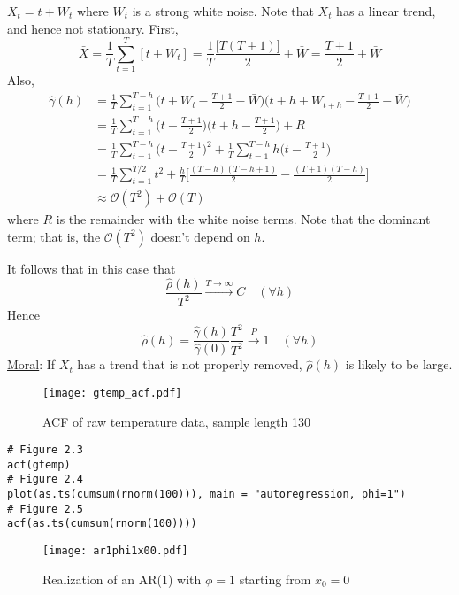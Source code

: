 \begin{Example}{}{}
    $ X_t=t+W_t $ where $ W_t $ is a strong white noise. Note that
    $ X_t $ has a linear trend, and hence not stationary.
    First,
    \[ \bar{X}=\frac{1}{T} \sum_{t=1}^{T}[t+W_t]=\frac{1}{T}
        \frac{\bigl[T(T+1)\bigr]}{2}+\bar{W}=\frac{T+1}{2} +\bar{W}  \]
    Also,
    \begin{align*}
        \hat{\gamma}(h)
         & =\frac{1}{T} \sum_{t=1}^{T-h}\biggl(t+W_t-\frac{T+1}{2} -\bar{W}\biggr)\biggl(t+h+W_{t+h}-\frac{T+1}{2}-\bar{W}\biggr)        \\
         & =\frac{1}{T} \sum_{t=1}^{T-h}\biggl(t-\frac{T+1}{2}\biggr)\biggl(t+h-\frac{T+1}{2}\biggr)+R                                   \\
         & =\frac{1}{T} \sum_{t=1}^{T-h} \biggl(t-\frac{T+1}{2}\biggr)^{\!2}+\frac{1}{T} \sum_{t=1}^{T-h} h\biggl(t-\frac{T+1}{2}\biggr) \\
         & =\frac{1}{T} \sum_{t=1}^{T/2} t^2+\frac{h}{T} \biggl[\frac{(T-h)(T-h+1)}{2}-\frac{(T+1)(T-h)}{2} \biggr]                      \\
         & \approx \mathcal{O}(T^2)+\mathcal{O}(T)
    \end{align*}
    where $ R $ is the remainder with the white noise terms. Note that
    the dominant term; that is, the $ \mathcal{O}(T^2) $ doesn't depend on $ h $.

    It follows that in this case that
    \[ \frac{\hat{\rho}(h)}{T^2}\xrightarrow{T\to\infty} C\quad(\forall h)  \]
    Hence
    \[ \hat{\rho}(h)=\frac{\hat{\gamma}(h)}{\hat{\gamma}(0)}\frac{T^2}{T^2}\stackrel{P}{\to}1\quad(\forall h)  \]
    \underline{Moral}: If $ X_t $ has a trend that is not properly removed,
    $ \hat{\rho}(h) $ is likely to be large.
\end{Example}
\begin{figure}[!ht]
    \centering
    \texttt{[image: gtemp\_acf.pdf]}
    \caption{ACF of raw temperature data, sample length 130}\label{fig:gtemp_acf}
\end{figure}
\begin{verbatim}
# Figure 2.3
acf(gtemp)
# Figure 2.4
plot(as.ts(cumsum(rnorm(100))), main = "autoregression, phi=1")
# Figure 2.5
acf(as.ts(cumsum(rnorm(100))))
\end{verbatim}
\begin{figure}[!ht]
    \centering
    \texttt{[image: ar1phi1x00.pdf]}
    \caption{Realization of an AR(1) with $ \phi=1 $ starting from
        $ x_0=0 $}\label{fig:ar1phi1x00}
\end{figure}

